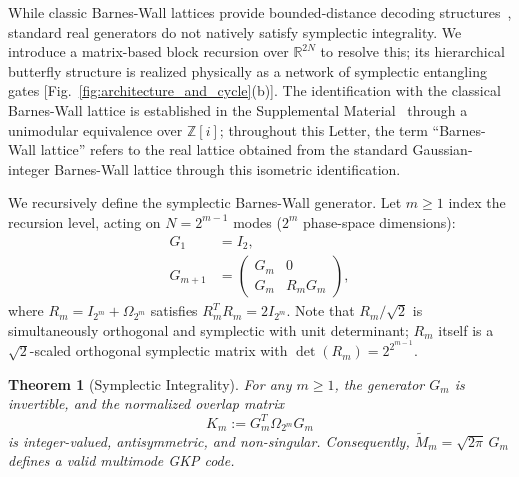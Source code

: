 \documentclass[aps,prl,twocolumn,superscriptaddress]{revtex4-2}
\newtheorem{theorem}{Theorem}
\newcommand{\symp}{\Omega}
\begin{document}

While classic Barnes-Wall lattices provide bounded-distance decoding structures~\cite{barnes1959,micciancio2008}, standard real generators do not natively satisfy symplectic integrality. We introduce a matrix-based block recursion over $\mathbb{R}^{2N}$ to resolve this; its hierarchical butterfly structure is realized physically as a network of symplectic entangling gates [Fig.~\ref{fig:architecture_and_cycle}(b)]. The identification with the classical Barnes-Wall lattice is established in the Supplemental Material~\cite{SM} through a unimodular equivalence over $\mathbb{Z}[i]$; throughout this Letter, the term ``Barnes-Wall lattice'' refers to the real lattice obtained from the standard Gaussian-integer Barnes-Wall lattice through this isometric identification.

We recursively define the symplectic Barnes-Wall generator. Let $m \geq 1$ index the recursion level, acting on $N = 2^{m-1}$ modes ($2^m$ phase-space dimensions):
%
\begin{align}
    G_1 &= I_2, \label{eq:g1} \\
    G_{m+1} &= \begin{pmatrix} G_m & 0 \\ G_m & R_m G_m \end{pmatrix}, \label{eq:grec}
\end{align}
%
where $R_m = I_{2^m} + \symp_{2^m}$ satisfies $R_m^T R_m = 2 I_{2^m}$. Note that $R_m/\sqrt{2}$ is simultaneously orthogonal and symplectic with unit determinant; $R_m$ itself is a $\sqrt{2}$-scaled orthogonal symplectic matrix with $\det(R_m) = 2^{2^{m-1}}$.

\begin{theorem}[Symplectic Integrality]\label{thm:main}
For any $m \geq 1$, the generator $G_m$ is invertible, and the normalized overlap matrix
\begin{equation}
K_m := G_m^T \symp_{2^m} G_m
\end{equation}
is integer-valued, antisymmetric, and non-singular. Consequently, $\tilde{M}_m = \sqrt{2\pi}\, G_m$ defines a valid multimode GKP code.
\end{theorem}
\end{document}
